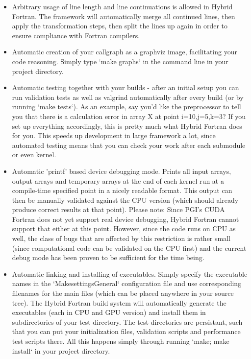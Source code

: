 \begin{itemize}
 \item Arbitrary usage of line length and line continuations is allowed in Hybrid Fortran. The framework will automatically merge all continued lines, then apply the transformation steps, then split the lines up again in order to ensure compliance with Fortran compilers.

 \item Automatic creation of your callgraph as a graphviz image, facilitating your code reasoning. Simply type `make graphs` in the command line in your project directory.

 \item Automatic testing together with your builds - after an initial setup you can run validation tests as well as valgrind automatically after every build (or by running `make tests`). As an example, say you'd like the preprocessor to tell you that there is a calculation error in array X at point i=10,j=5,k=3? If you set up everything accordingly, this is pretty much what Hybrid Fortran does for you. This speeds up development in large framework a lot, since automated testing means that you can check your work after each submodule or even kernel.

 \item Automatic 'printf' based device debugging mode. Prints all input arrays, output arrays and temporary arrays at the end of each kernel run at a compile-time specified point in a nicely readable format. This output can then be manually validated against the CPU version (which should already produce correct results at that point). Please note: Since PGI's CUDA Fortran does not yet support real device debugging, Hybrid Fortran cannot support that either at this point. However, since the code runs on CPU as well, the class of bugs that are affected by this restriction is rather small (since computational code can be validated on the CPU first) and the current debug mode has been proven to be sufficient for the time being.

 \item Automatic linking and installing of executables. Simply specify the executable names in the `MakesettingsGeneral` configuration file and use corresponding filenames for the main files (which can be placed anywhere in your source tree). The Hybrid Fortran build system will automatically generate the executables (each in CPU and GPU version) and install them in subdirectories of your test directory. The test directories are persistant, such that you can put your initialization files, validation scripts and performance test scripts there. All this happens simply through running `make; make install` in your project directory.
\end{itemize}

